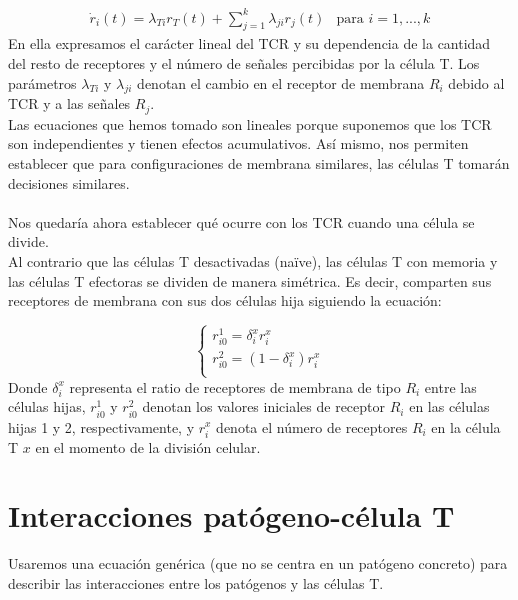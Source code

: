 \documentclass{article}
\begin{document}
	\begin{displaymath}
        \begin{array}{ll}
        \dot{r}_{i}(t) = \lambda_{Ti}r_{T}(t) + \sum_{j=1}^{k}\lambda_{ji}r_{j}(t) & \mbox{para $i=1,...,k$} 
        \end{array}
    \end{displaymath}
	En ella expresamos el carácter lineal del TCR y su dependencia de la cantidad del resto de receptores y el número de señales percibidas por la célula T. Los parámetros $\lambda_{Ti}$ y $\lambda_{ji}$ denotan el cambio en el receptor de membrana $R_{i}$ debido al TCR y a las señales $R_{j}$.
	\\
	Las ecuaciones que hemos tomado son lineales porque suponemos que los TCR son independientes y tienen efectos acumulativos. Así mismo, nos permiten establecer que para configuraciones de membrana similares, las células T tomarán decisiones similares.
	\\
	\\
	Nos quedaría ahora establecer qué ocurre con los TCR cuando una célula se divide. 
	\\
	Al contrario que las células T desactivadas (naïve), las células T con memoria y las células T efectoras se dividen de manera simétrica. Es decir, comparten sus receptores de membrana con sus dos células hija siguiendo la ecuación:
	
	\begin{displaymath}
         \left\{ \begin{array}{l}
        r_{i0}^{1}= \delta_{i}^{x} r_{i}^{x}\\
        r_{i0}^{2}= (1-\delta_{i}^{x}) r_{i}^{x} \\
        \end{array}
        \right.
    \end{displaymath}
	Donde $\delta_{i}^{x}$ representa el ratio de receptores de membrana de tipo $R_{i}$ entre las células hijas, $r_{i0}^{1}$ y $r_{i0}^{2}$ denotan los valores iniciales de receptor $R_{i}$ en las células hijas 1 y 2, respectivamente, y  $r_{i}^{x}$ denota el número de receptores $R_{i}$ en la célula T $x$ en el momento de la división celular.
	
	\section{Interacciones patógeno-célula T}
	Usaremos una ecuación genérica (que no se centra en un patógeno concreto) para describir las interacciones entre los patógenos y las células T.
	
\end{document}
